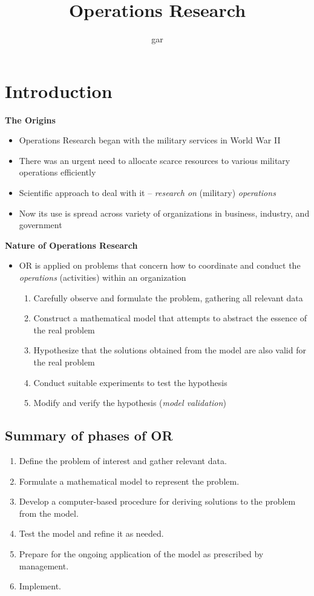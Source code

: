 \documentclass[12pt]{article}
\date {}
\title{\bf \LARGE Operations Research}
\author{gar}
\begin{document}
\maketitle
\setcounter{tocdepth}{3}
\tableofcontents
\vspace*{1cm}
\section{ Introduction }
{\large \bf The Origins}\\
\begin{itemize}
\item Operations Research began with the military services in World War II
\item There was an urgent need to allocate scarce resources to various military operations efficiently
\item Scientific approach to deal with it -- \emph{research on} (military) \emph{operations}
\item Now its use is spread across variety of organizations in business, industry, and government
\end{itemize}
{\large \bf Nature of Operations Research}\\
\begin{itemize}
\item OR is applied on problems that concern how to coordinate and conduct the \emph{operations} (activities) within an organization
\begin{enumerate}
\item Carefully observe and formulate the problem, gathering all relevant data
\item Construct a mathematical model that attempts to abstract the essence of the real problem
\item Hypothesize that the solutions obtained from the model are also valid for the real problem
\item Conduct suitable experiments to test the hypothesis
\item Modify and verify the hypothesis (\emph{model validation})
\end{enumerate}
\end{itemize}

\subsection*{Summary of phases of OR}
\begin{enumerate}
\item Define the problem of interest and gather relevant data.
\item Formulate a mathematical model to represent the problem.
\item Develop a computer-based procedure for deriving solutions to the problem from the model.
\item Test the model and refine it as needed.
\item Prepare for the ongoing application of the model as prescribed by management.
\item Implement.
\end{enumerate}
\end{document}
